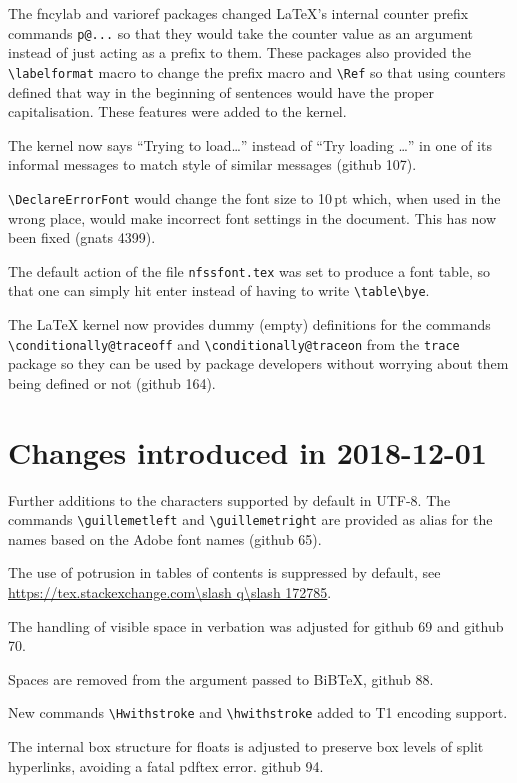 \documentclass{ltxguide}
\newcommand\ghissue[1]{github #1}
\newcommand\gnatsissue[1]{gnats #1}
\newcommand\sxquestion[1]{\url{https://tex.stackexchange.com\slash q\slash #1}}
\newcommand\ghissue[1]{%
    \href{https://github.com/latex3/latex2e/issues/#1}{github #1}}
\newcommand\gnatsissue[1]{%
    \href{https://www.latex-project.org/cgi-bin/ltxbugs2html?pr=latex/#1}{gnats #1}}
\newcommand\sxquestion[1]{%
     \url{https://tex.stackexchange.com/q/#1}}
\begin{document}
The \textsf{fncylab} and \textsf{varioref} packages changed \LaTeX's internal
counter prefix commands \verb|p@...| so that they would take the counter
value as an argument instead of just acting as a prefix to them. These
packages also provided the \verb|\labelformat| macro to change the prefix
macro and \verb|\Ref| so that using counters defined that way in the
beginning of sentences would have the proper capitalisation. These features
were added to the \LaTeXe{} kernel.

The kernel now says ``Trying to load\ldots''
instead of ``Try loading \ldots'' in one of its informal
messages to match style of similar messages (\ghissue{107}).

\verb|\DeclareErrorFont| would change the font size to 10\,pt which, when
used in the wrong place, would make incorrect font settings in the document.
This has now been fixed (\gnatsissue{4399}).

The default action of the file \texttt{nfssfont.tex} was set to produce a
font table, so that one can simply hit enter instead of having to write
\verb=\table\bye=.

The \LaTeX{} kernel now provides dummy (empty) definitions for the
commands \verb|\conditionally@traceoff| and
\verb|\conditionally@traceon| from the \texttt{trace} package so they
can be used by package developers without worrying about them being
defined or not (\ghissue{164}).





\section{Changes introduced in 2018-12-01}

Further additions to the characters supported by default in UTF-8.
The commands \verb|\guillemetleft| and \verb|\guillemetright| are
provided as alias for the names based on the Adobe font names
(\ghissue{65}).

The use of potrusion in tables of contents is suppressed by default,
see \sxquestion{172785}.

The handling of visible space in verbation was adjusted for
\ghissue{69} and \ghissue{70}.

Spaces are removed from the argument passed to BiBTeX, \ghissue{88}.

New commands \verb|\Hwithstroke| and \verb|\hwithstroke| added to T1 encoding support.

The internal box structure for floats is adjusted to preserve box
levels of split hyperlinks, avoiding a fatal pdftex error. \ghissue{94}.
\end{document}
